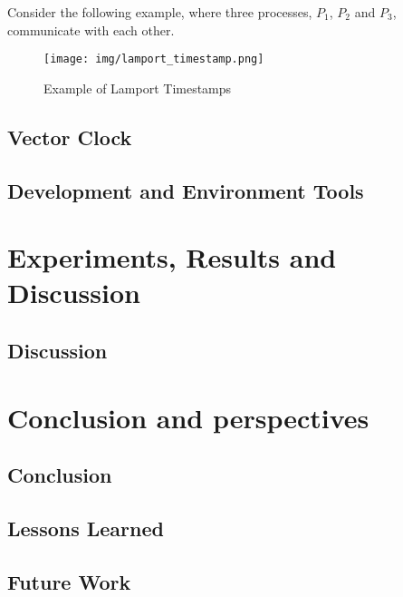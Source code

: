 \documentclass{article}
\begin{document}
    Consider the following example, where three processes, $P_1$, $P_2$ and $P_3$, communicate with each other.
    \begin{figure}
      \centering
      \texttt{[image: img/lamport\_timestamp.png]}
      \caption{Example of Lamport Timestamps}
      \label{fig:lamport_timestamp}
    \end{figure}

  \subsection{Vector Clock}

  \subsection{Development and Environment Tools}

\section{Experiments, Results and Discussion}
  

  \subsection{Discussion}

\section{Conclusion and perspectives}
    \subsection{Conclusion}
    
    \subsection{Lessons Learned}

    \subsection{Future Work}

\newpage
    \nocite{*}
\end{document}
